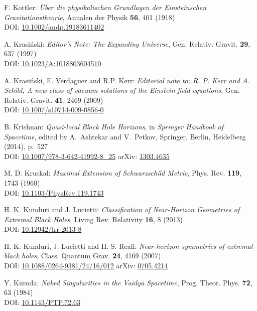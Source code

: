 \begin{thebibliography}{123}
F.  Kottler:
{\em \"Uber die physikalischen Grundlagen der Einsteinschen Gravitationstheorie},
Annalen der Physik {\bf 56}, 401 (1918)\\
DOI: \href{https://doi.org/10.1002/andp.19183611402}{10.1002/andp.19183611402}

A. Krasi\'nski:
{\em Editor's Note: The Expanding Universe},
Gen. Relativ. Gravit. {\bf 29}, 637 (1997)\\
DOI: \href{https://doi.org/10.1023/A:1018803604510}{10.1023/A:1018803604510}

A. Krasi\'nski, E. Verdaguer and R.P. Kerr:
{\em Editorial note to: R. P. Kerr and A. Schild, A new class of vacuum solutions of the Einstein field equations},
Gen. Relativ. Gravit. {\bf 41}, 2469 (2009)\\
DOI: \href{https://doi.org/10.1007/s10714-009-0856-0}{10.1007/s10714-009-0856-0}

B. Krishnan:
{\em Quasi-local Black Hole Horizons},
in {\em Springer Handbook of Spacetime}, edited by A.~Ashtekar and V.~Petkov,
Springer, Berlin, Heidelberg (2014), p.~527\\
DOI: \href{https://doi.org/10.1007/978-3-642-41992-8_25}{10.1007/978-3-642-41992-8\_25}\hfill
arXiv: \href{https://arxiv.org/abs/1303.4635}{1303.4635}

M. D. Kruskal:
{\em Maximal Extension of Schwarzschild Metric},
Phys. Rev. {\bf 119}, 1743 (1960)\\
DOI: \href{https://doi.org/10.1103/PhysRev.119.1743}{10.1103/PhysRev.119.1743}

H. K. Kunduri and J. Lucietti:
{\em Classification of Near-Horizon Geometries of Extremal Black Holes},
Living Rev. Relativity {\bf 16}, 8 (2013)\\
DOI: \href{https://doi.org/10.12942/lrr-2013-8}{10.12942/lrr-2013-8}

H. K. Kunduri, J. Lucietti and H. S. Reall:
{\em Near-horizon symmetries of extremal black holes},
Class. Quantum Grav. {\bf 24}, 4169 (2007)\\
DOI: \href{https://doi.org/10.1088/0264-9381/24/16/012}{10.1088/0264-9381/24/16/012}\hfill
arXiv: \href{https://arxiv.org/abs/0705.4214}{0705.4214}

Y. Kuroda:
{\em Naked Singularities in the Vaidya Spacetime},
Prog. Theor. Phys. {\bf 72}, 63 (1984)\\
DOI: \href{https://doi.org/10.1143/PTP.72.63}{10.1143/PTP.72.63}


\end{thebibliography}
